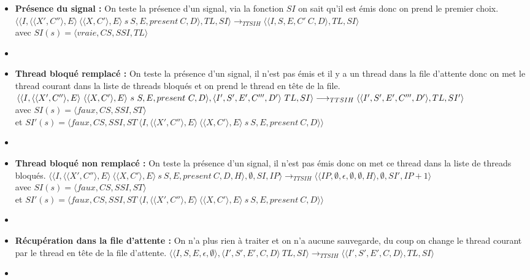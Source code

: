 \documentclass[10pt,a4paper]{report}
\begin{document}
\begin{enumerate}
\begin{itemize}
			\item[] \textbf{Présence du signal :} On teste la présence d'un signal, via la fonction $SI$ on sait qu'il est émis donc on prend le premier choix.
			\smallbreak
			$\langle\langle I,\langle\langle X',C''\rangle,E\rangle~\langle\langle X,C'\rangle,E\rangle~s~S,E,present~C,D\rangle,TL,SI\rangle 
			\longrightarrow_{TTSIH} 
			\langle\langle I,S,E,C'~C,D\rangle,TL,SI\rangle$ 
			\\avec $SI(s) = \langle vraie,CS,SSI,TL\rangle$
			\item[] \newpage
			
			
			
			
			\item[] \textbf{ Thread bloqué remplacé :} On teste la présence d'un signal, il n'est pas émis et il y a un thread dans la file d'attente donc on met le thread courant dans la liste de threads bloqués et on prend le thread en tête de la file.
			\smallbreak
			$\langle\langle I,\langle\langle X',C''\rangle,E\rangle~\langle\langle X,C'\rangle,E\rangle~s~S,E,present~C,D\rangle,\langle I',S',E',C''',D'\rangle~TL,SI\rangle 
			\\\longrightarrow_{TTSIH} 
			\langle\langle I',S',E',C''',D'\rangle,TL,SI'\rangle$ 
			\\avec $SI(s) = \langle faux,CS,SSI,ST\rangle$
			\\et $SI'(s) = \langle faux,CS,SSI,ST~\langle I,\langle\langle X',C''\rangle,E\rangle~\langle\langle X,C'\rangle,E\rangle~s~S,E,present~C,D\rangle\rangle$
			\item[]	
			
			\item[] \textbf{Thread bloqué non remplacé :} On teste la présence d'un signal, il n'est pas émis donc on met ce thread dans la liste de threads bloqués.
			\smallbreak 
			$\langle\langle I,\langle\langle X',C''\rangle,E\rangle~\langle\langle X,C'\rangle,E\rangle~s~S,E,present~C,D,H\rangle,\emptyset,SI,IP\rangle 
			\longrightarrow_{TTSIH} 
			\langle\langle IP,\emptyset,\epsilon,\emptyset,\emptyset,H\rangle,\emptyset,SI',IP+1\rangle$
			\\avec $SI(s) = \langle faux,CS,SSI,ST\rangle$
			\\et $SI'(s) = \langle faux,CS,SSI,ST~\langle I,\langle\langle X',C''\rangle,E\rangle~\langle\langle X,C'\rangle,E\rangle~s~S,E,present~C,D\rangle\rangle$
			\item[]
			
			\item[] \textbf{Récupération dans la file d'attente :} On n'a plus rien à traiter et on n'a aucune sauvegarde, du coup on change le thread courant par le thread en tête de la file d'attente.
			\smallbreak
			$\langle\langle I,S,E,\epsilon,\emptyset\rangle,\langle I',S',E',C,D\rangle~TL,SI\rangle 
			\longrightarrow_{TTSIH} 
			\langle\langle I',S',E',C,D\rangle,TL,SI\rangle$
			\item[]
			

\end{itemize}
\end{enumerate}
\end{document}
